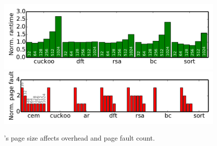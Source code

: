 \begin{figure}
	\centering
	\includegraphics[width=\columnwidth]{figures/ramPagsSizes}
	\includegraphics[width=\columnwidth]{figures/pagefault}
	\caption{\sys's page size affects overhead and page fault count.}
	\label{fig:IPOSPerformance}
	\label{fig:page_size}
\end{figure}





 
